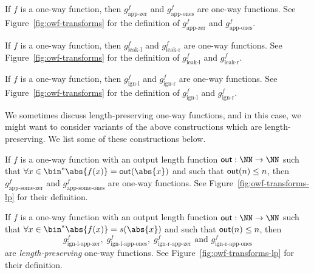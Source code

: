 \begin{theorem}\label{thm:owf-app-zer}
	If $f$ is a one-way function, then $g^f_{\text{app-zer}}$ and $g^f_{\text{app-ones}}$ are one-way functions. See Figure~\ref{fig:owf-transforms} for the definition of $g^f_{\text{app-zer}}$ and $g^f_{\text{app-ones}}$.
\end{theorem}
\begin{theorem}
	If $f$ is a one-way function, then $g^f_{\text{leak-l}}$ and $g^f_{\text{leak-r}}$ are one-way functions. See Figure~\ref{fig:owf-transforms} for the definition of $g^f_{\text{leak-l}}$ and $g^f_{\text{leak-r}}$.
\end{theorem}
\begin{theorem}
	If $f$ is a one-way function, then $g^f_{\text{ign-l}}$ and $g^f_{\text{ign-r}}$ are one-way functions. See Figure~\ref{fig:owf-transforms} for the definition of $g^f_{\text{ign-l}}$ and $g^f_{\text{ign-r}}$.
\end{theorem}
We sometimes discuss length-preserving one-way functions, and in this case, we might want to consider variants of the above constructions which are length-preserving. We list some of these constructions below.
\begin{theorem}
	If $f$ is a one-way function with an output length function $\O{out}:\NN\rightarrow\NN$ such that $\forall x\in\bin^* \abs{f(x)}=\O{out}(\abs{x})$ and such that $\mathsf{out}(n)\leq n$, then $g^f_{\text{app-some-zer}}$ and $g^f_{\text{app-some-ones}}$ are one-way functions. See Figure~\ref{fig:owf-transforms-lp} for their definition.
\end{theorem}
\begin{theorem}
	If $f$ is a one-way function with an output length function $\O{out}:\NN\rightarrow\NN$ such that $\forall x\in\bin^* \abs{f(x)}=s(\abs{x})$ and such that $\mathsf{out}(n)\leq n$, then
	\[g^f_{\text{ign-l-app-zer}},\;
		g^f_{\text{ign-l-app-ones}},\;
		g^f_{\text{ign-r-app-zer}}\text{ and }
		g^f_{\text{ign-r-app-ones}}\]
	are \emph{length-preserving} one-way functions. See Figure~\ref{fig:owf-transforms-lp} for their definition.
\end{theorem}

